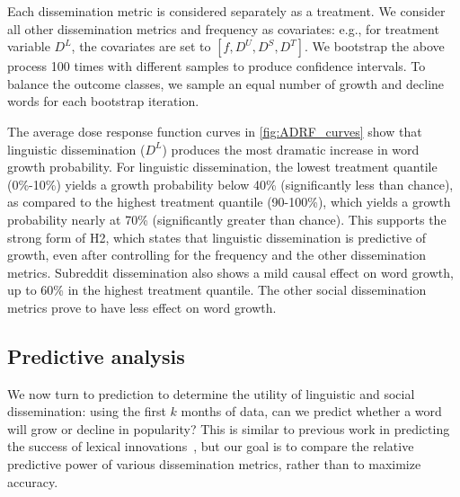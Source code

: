 Each dissemination metric is considered separately as a treatment. 
We consider all other dissemination metrics and frequency as covariates: e.g., for treatment variable $D^{L}$, the covariates are set to $[f,D^{U},D^{S},D^{T}]$.
We bootstrap the above process 100 times with different samples to produce confidence intervals.
To balance the outcome classes, we sample an equal number of growth and decline words for each bootstrap iteration.

The average dose response function curves in \autoref{fig:ADRF_curves} show that linguistic dissemination ($D^{L}$) produces the most dramatic increase in word growth probability.
For linguistic dissemination, the lowest treatment quantile (0\%-10\%) yields a growth probability below 40\% (significantly less than chance), as compared to the highest treatment quantile (90-100\%), which yields a growth probability nearly at 70\% (significantly greater than chance). 
This supports the strong form of H2, which states that linguistic dissemination is predictive of growth, even after controlling for the frequency and the other dissemination metrics. 
Subreddit dissemination also shows a mild causal effect on word growth, up to 60\% in the highest treatment quantile.
The other social dissemination metrics prove to have less effect on word growth.

\subsection{Predictive analysis}
\label{sec:results-binary-predict}
We now turn to prediction to determine the utility of linguistic and social dissemination: using the first $k$ months of data, can we predict whether a word will grow or decline in popularity?
This is similar to previous work in predicting the success of lexical innovations~\cite{kooti2012predicting}, but our goal is to compare the relative predictive power of various dissemination metrics, rather than to maximize accuracy.

